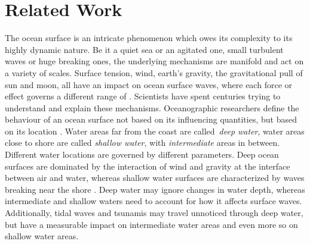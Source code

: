 \chapter{Related Work}
\label{ch:state_of_the_art}
%
The ocean surface is an intricate phenomenon which owes its complexity
to its highly dynamic nature. Be it a quiet sea or an agitated one, small
turbulent waves or huge breaking ones, the underlying mechanisms are manifold
and act on a variety of scales. 
Surface tension, wind, earth's gravity, the gravitational pull of
sun and moon, all have an impact on ocean surface waves, where each force or
effect governs a different range of \wavelengths \citep{article:munkorigin}.
Scientists have spent centuries trying to understand and explain these mechanisms.
%
Oceanographic researchers define the behaviour of an ocean surface not based
on its influencing quantities, but based on its location
\citep{book:windgeneratedoceanwaves}. Water areas far from the
coast are called~\emph{deep water}, water areas close to shore are called
\emph{shallow water}, with \emph{intermediate} areas in between. Different
water locations are governed by different parameters. Deep ocean surfaces are
dominated by the interaction of wind and gravity at the interface
between air and water, whereas shallow water surfaces are characterized by waves
breaking near the shore \citep{book:kinsman2002wind}.
Deep water may ignore changes in water depth,
whereas intermediate and shallow waters need to account for how it affects
surface waves. Additionally, tidal waves and tsunamis may travel unnoticed
through deep water, but have a measurable impact on intermediate water areas
and even more so on shallow water areas.
% 
%

